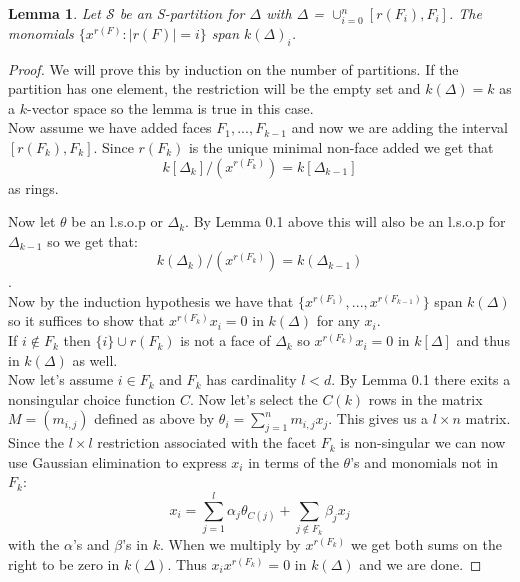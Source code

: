\documentclass[a4paper]{article}
\newtheorem{lemma}[theorem]{Lemma}
\begin{document}
{ 

\begin{lemma} 
Let $\mathcal{S}$ be an S-partition for $\Delta$ with $\Delta$  = $\cup_{i=0}^n [r(F_i), F_i]$. The monomials $\{x^{r(F)}:|r(F)|=i\}$ span $k(\Delta)_i$. \\ 
\end{lemma}

\begin{proof} We will prove this by induction on the number of partitions. If the partition has one element, the restriction will be the empty set and $k(\Delta) = k$ as a $k$-vector space so the lemma is true in this case. \\

Now assume we have added faces $F_1, ..., F_{k-1}$ and now we are adding the interval $[r(F_k), F_k]$. Since $r(F_k)$ is the unique minimal non-face added we get that $$k[\Delta_k]/(x^{r(F_k)}) = k[\Delta_{k-1}]$$ as rings. 

Now let $\theta$ be an l.s.o.p or $\Delta_k$. By Lemma 0.1 above this will also be an l.s.o.p for $\Delta_{k-1}$ so we get that: $$k(\Delta_k)/(x^{r(F_k)}) = k(\Delta_{k-1})$$. \\

Now by the induction hypothesis we have that $\{x^{r(F_1)},..., x^{r(F_{k-1})}\}$ span $k(\Delta)$ so it suffices to show that $x^{r(F_k)}x_i = 0$ in $k(\Delta)$ for any $x_i$. \\

If $i \not\in F_k$ then $\{i\} \cup r(F_k)$ is not a face of $\Delta_k$ so $x^{r(F_k)}x_i = 0$ in $k[\Delta]$ and thus in $k(\Delta)$ as well. \\

Now let's assume $i \in F_k$ and $F_k$ has cardinality $l <d$. By Lemma 0.1 there exits a nonsingular choice function $C$. Now let's select the $C(k)$ rows in the matrix  $M = (m_{i,j})$ defined as above by $\theta_i = \sum\limits_{j=1}^n m_{i,j}x_j$. This gives us a $l \times n$ matrix. Since the $l \times l$ restriction associated with the facet $F_k$ is non-singular we can now use Gaussian elimination to express $x_i$ in terms of the $\theta$'s and monomials not in $F_k$: $$x_i = \sum_{j=1}^l \alpha_j \theta_{C(j)} + \sum_{j \not\in F_k} \beta_j x_j $$ with the $\alpha$'s and $\beta$'s in $k$. When we multiply by $x^{r(F_k)}$ we get both sums on the right to be zero in $k(\Delta)$. Thus $x_i x^{r(F_k)} = 0$ in $k(\Delta)$ and we are done.

\end{proof}


}
\end{document}

